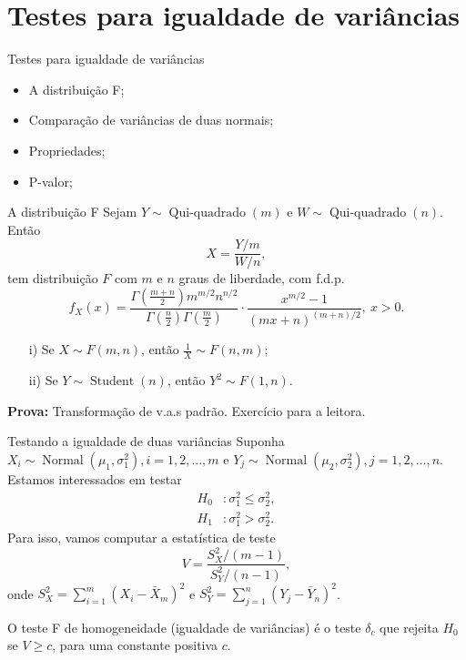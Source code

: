 \section{Testes para igualdade de variâncias}
\begin{frame}{Testes para igualdade de variâncias}
 \begin{itemize}
   \item A distribuição F;
   \item Comparação de variâncias de duas normais;
   \item Propriedades; 
   \item P-valor;
   \end{itemize}
\end{frame}


 \begin{frame}{A distribuição F}
  Sejam $Y \sim\operatorname{Qui-quadrado}(m)$ e $W \sim\operatorname{Qui-quadrado}(n)$.
  Então 
  \begin{equation*}
   X = \frac{Y/m}{W/n},
  \end{equation*}
tem distribuição $F$ com $m$ e $n$ graus de liberdade, com f.d.p.
\begin{equation*}
 f_X(x) = \frac{\Gamma\left(\frac{m + n}{2}\right)m^{m/2} n^{n/2}}{\Gamma\left(\frac{n}{2}\right)\Gamma\left(\frac{m}{2}\right)} \cdot \frac{x^{m/2}-1}{(mx + n)^{(m + n)/2}}, \: x > 0.
\end{equation*}
\begin{theo}
 \begin{itemize}
  \item[i)] Se $X \sim F(m, n)$, então $\frac{1}{X} \sim F(n, m)$;
  \item[ii)] Se $Y \sim\operatorname{Student}(n)$, então $Y^2 \sim F(1, n)$.
 \end{itemize}
\end{theo}
\textbf{Prova:} Transformação de v.a.s padrão.
Exercício para a leitora.
 \end{frame}

 \begin{frame}{Testando a igualdade de duas variâncias}
  Suponha $X_i \sim\operatorname{Normal}(\mu_1, \sigma_1^2), i = 1, 2, \ldots, m$ e $Y_j \sim\operatorname{Normal}(\mu_2, \sigma_2^2), j = 1, 2, \ldots, n$.
  Estamos interessados em testar
  \begin{align*}
   H_0 &: \sigma_1^2 \leq \sigma_2^2 , \\
   H_1&:  \sigma_1^2 > \sigma_2^2. 
  \end{align*}
 Para isso, vamos computar a estatística de teste 
 \begin{equation*}
  V = \frac{S_X^2/(m-1)}{S_Y^2/(n-1)},
 \end{equation*}
 onde $S_X^2 = \sum_{i=1}^m (X_i-\bar{X}_m)^2$ e $S_Y^2 = \sum_{j=1}^n (Y_j-\bar{Y}_n)^2$.
 
 \begin{defn}[O teste F]
 \label{def:F_test}
  O teste F de homogeneidade (igualdade de variâncias)  é o teste $\delta_c$ que rejeita $H_0$ se $V \geq c$, para uma constante positiva $c$.
 \end{defn}

 \end{frame}

